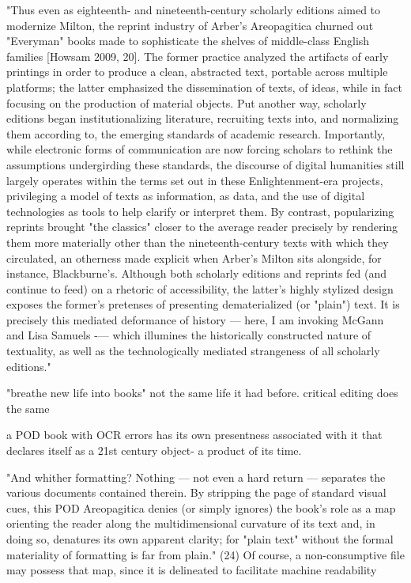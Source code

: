 \documentclass[course, english]{Notes}
\begin{document}
\begin{outline}
\1 "Thus even as eighteenth- and nineteenth-century scholarly editions aimed to modernize Milton, the reprint industry of Arber's Areopagitica churned out "Everyman" books made to sophisticate the shelves of middle-class English families [Howsam 2009, 20]. The former practice analyzed the artifacts of early printings in order to produce a clean, abstracted text, portable across multiple platforms; the latter emphasized the dissemination of texts, of ideas, while in fact focusing on the production of material objects. Put another way, scholarly editions began institutionalizing literature, recruiting texts into, and normalizing them according to, the emerging standards of academic research. Importantly, while electronic forms of communication are now forcing scholars to rethink the assumptions undergirding these standards, the discourse of digital humanities still largely operates within the terms set out in these Enlightenment-era projects, privileging a model of texts as information, as data, and the use of digital technologies as tools to help clarify or interpret them. By contrast, popularizing reprints brought "the classics" closer to the average reader precisely by rendering them more materially other than the nineteenth-century texts with which they circulated, an otherness made explicit when Arber's Milton sits alongside, for instance, Blackburne's. Although both scholarly editions and reprints fed (and continue to feed) on a rhetoric of accessibility, the latter's highly stylized design exposes the former's pretenses of presenting dematerialized (or "plain") text. It is precisely this mediated deformance of history — here, I am invoking McGann and Lisa Samuels -— which illumines the historically constructed nature of textuality, as well as the technologically mediated strangeness of all scholarly editions." 

\1 "breathe new life into books"
	\2 not the same life it had before. 
		\3 critical editing does the same

\1 a POD book with OCR errors has its own presentness associated with it that declares itself as a 21st century object- a product of its time. 

\1 "And whither formatting? Nothing — not even a hard return — separates the various documents contained therein. By stripping the page of standard visual cues, this POD Areopagitica denies (or simply ignores) the book's role as a map orienting the reader along the multidimensional curvature of its text and, in doing so, denatures its own apparent clarity; for "plain text" without the formal materiality of formatting is far from plain." (24)
	\2 Of course, a non-consumptive file may possess that map, since it is delineated to facilitate machine readability 

\end{outline}
\end{document}
